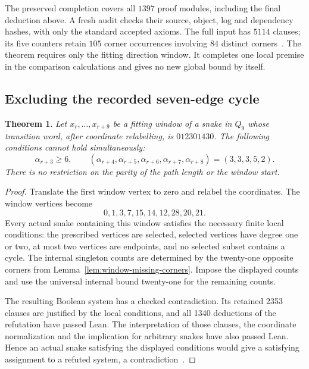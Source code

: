 \documentclass[11pt,a4paper]{article}
\newtheorem{theorem}{Theorem}[section]
\theoremstyle{definition}
\theoremstyle{remark}
\newcommand{\Q}{Q}
\begin{document}
The preserved completion covers all $1397$ proof modules, including the
final deduction above. A fresh audit checks their source, object, log and
dependency hashes, with only the standard accepted axioms. The full input
has $5114$ clauses; its five counters retain $105$ corner occurrences
involving $84$ distinct corners~\cite{criticalcountarchive,totalcountarchive,share145archive}.
The theorem requires only the fitting direction window. It completes one
local premise in the comparison calculations and gives no new global bound
by itself.

\subsection{Excluding the recorded seven-edge cycle}\label{sec:seven-cycle-exclusion}
\begin{theorem}\label{thm:nine-window-exclusion}
Let $x_r,\ldots,x_{r+9}$ be a fitting window of a snake in $\Q_9$ whose
transition word, after coordinate relabelling, is $012301430$.
The following conditions cannot hold simultaneously:
\[
\alpha_{r+3}\ge6,\qquad
(\alpha_{r+4},\alpha_{r+5},\alpha_{r+6},\alpha_{r+7},\alpha_{r+8})
=(3,3,3,5,2).
\]
There is no restriction on the parity of the path length or the window start.
\end{theorem}
\begin{proof}
Translate the first window vertex to zero and relabel the coordinates.
The window vertices become
\[
0,1,3,7,15,14,12,28,20,21.
\]
Every actual snake containing this window satisfies the necessary finite
local conditions: the prescribed vertices are selected, selected vertices
have degree one or two, at most two vertices are endpoints, and no selected
subset contains a cycle. The internal singleton counts are determined by
the twenty-one opposite corners from Lemma~\ref{lem:window-missing-corners}.
Impose the displayed counts and use the universal internal bound
twenty-one for the remaining counts.

The resulting Boolean system has a checked contradiction. Its retained
2353 clauses are justified by the local conditions, and all 1340 deductions
of the refutation have passed Lean. The interpretation of those clauses,
the coordinate normalization and the implication for arbitrary snakes have
also passed Lean. Hence an actual snake satisfying the displayed conditions
would give a satisfying assignment to a refuted system, a contradiction~\cite{sevencyclearchive}.
\end{proof}
\end{document}
